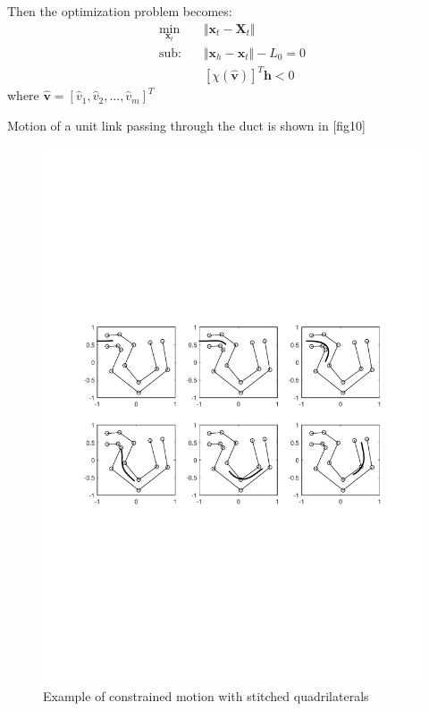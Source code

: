 \documentclass[11pt,a4paper]{article}
\begin{document}
 Then the optimization problem becomes:
\begin{align}
\label{eq:min,u,v,im}
\min_{\textbf{x}_t} &\Vert \textbf{x}_t-\textbf{X}_t \Vert\\
\nonumber \text{sub:~~~} &\Vert \textbf{x}_h - \textbf{x}_t \Vert -L_0 = 0\\
&\left[\chi\left(\hat{\mathbf{v}}\right)\right]^T\mathbf{h}<0
\end{align}
where $\hat{\mathbf{v}}=\left[\hat{v}_1,\hat{v}_2,...,\hat{v}_m\right]^T$

Motion of a unit link passing through the duct is shown in [fig10]

\begin{figure}[h]
\centering
\includegraphics[scale=0.75]{figures/fig10.pdf}
\caption{ Example of constrained motion with stitched quadrilaterals \label{fig:motionquads}}
\end{figure}
\end{document}
